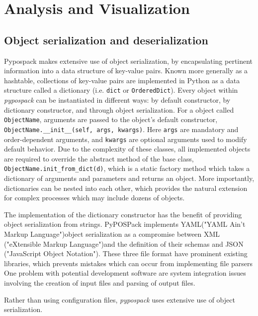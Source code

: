 \section{Analysis and Visualization}
\label{sec:software_analysis}
\subsection{Object serialization and deserialization}

Pypospack makes extensive use of object serialization, by encapsulating pertinent information into a data structure of key-value pairs.  
Known more generally as a hashtable, collections of key-value pairs are implemented in Python as a data structure called a dictionary (i.e. \verb|dict| or \verb|OrderedDict|).  
Every object within \emph{pypospack} can be instantiated in different ways: by default constructor, by dictionary constructor, and through object serialization.   
For a object called \verb|ObjectName|, arguments are passed to the object's default constructor, \verb|ObjectName.__init__(self, args, kwargs)|.  
Here \verb|args| are mandatory and order-dependent arguments, and \verb|kwargs| are optional arguments used to modify default behavior.  
Due to the complexity of these classes, all implemented objects are required to override the abstract method of the base class, \verb|ObjectName.init_from_dict(d)|, which is a static factory method which takes a dictionary of arguments and parameters and returns an object.  More importantly, dictionaries can be nested into each other, which provides the natural extension for complex processes which may include dozens of objects.

The implementation of the dictionary constructor has the benefit of providing object serialization from strings.  PyPOSPack implements YAML("YAML Ain't Markup Language")object serialization as a compromise between XML ("eXtensible Markup Language")and the definition of their schemas and JSON ("JavaScript Object Notation").  These three file format have prominent existing libraries, which prevents mistakes which can occur from implementing file parsers
One problem with potential development software are system integration issues involving the creation of input files and parsing of output files.

Rather than using configuration files, \emph{pypospack} uses extensive use of object serialization.

